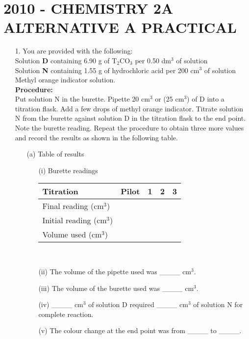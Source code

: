 \section{2010 - CHEMISTRY 2A ALTERNATIVE A PRACTICAL} 

\begin{enumerate}

\item[1.] You are provided with the following:\\
Solution \textbf{D} containing 6.90 g of T$_2$CO$_3$ per 0.50 dm$^3$ of solution\\
Solution \textbf{N} containing 1.55 g of hydrochloric acid per 200 cm$^3$ of solution\\
Methyl orange indicator solution.\\

\textbf{Procedure:}\\
Put solution N in the burette. Pipette 20 cm$^3$ or (25 cm$^3$) of D into a titration flask. Add a few drops of methyl orange indicator. Titrate solution N from the burette against solution D in the titration flask to the end point. Note the burette reading. Repeat the procedure to obtain three more values and record the results as shown in the following table.\\

\begin{enumerate}
\item[(a)] Table of results\\
\begin{enumerate}
\item[(i)] Burette readings\\
\begin{center}
\begin{tabular}{|l|p{2cm}|p{2cm}|p{2cm}|p{2cm}|} \hline
\textbf{Titration}&\multicolumn{1}{|c|}{\textbf{Pilot}}&\multicolumn{1}{|c|}{\textbf{1}}&\multicolumn{1}{|c|}{\textbf{2}}&\multicolumn{1}{|c|}{\textbf{3}}\\ \hline
Final reading (cm$^3$)&&&&\\ \hline
Initial reading (cm$^3$)&&&&\\ \hline
Volume used (cm$^3$)&&&&\\ \hline
\end{tabular}\\
\end{center}
\item[(ii)] The volume of the pipette used was \_\_\_\_ cm$^3$.
\item[(iii)] The volume of the burette used was \_\_\_\_ cm$^3$.
\item[(iv)] \_\_\_\_ cm$^3$ of solution D required \_\_\_\_ cm$^3$ of solution N for complete reaction.\\
\item[(v)] The colour change at the end point was from \_\_\_\_ to \_\_\_\_.\\
\end{enumerate}


\end{enumerate}
\end{enumerate}
